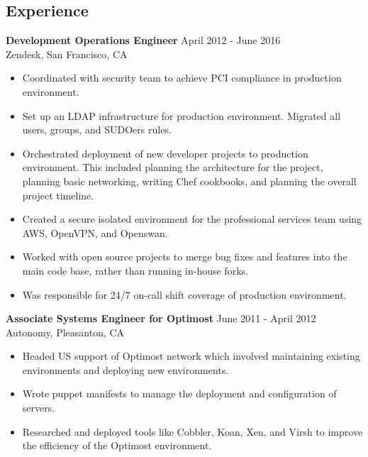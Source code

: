 \documentclass[10pt,line,letterpaper]{res}
\begin{document}
\address{968 Washington St Apt 4, San Francisco, CA}
\address{aaron.peschel@gmail.com or (760)-791-7301}

\begin{resume}
\pagestyle{empty}
\section{Experience}
    {\bf Development Operations Engineer} \hfill April 2012 - June 2016 \\
    Zendesk, San Francisco, CA
    \begin{itemize} \itemsep -2pt
    \item Coordinated with security team to achieve PCI compliance in production environment.
    \item Set up an LDAP infrastructure for production environment. Migrated all users, groups, and SUDOers rules.
    \item Orchestrated deployment of new developer projects to production environment. This included planning the architecture for the project, planning basic networking, writing Chef cookbooks, and planning the overall project timeline.
    \item Created a secure isolated environment for the professional services team using AWS, OpenVPN, and Openswan.
    \item Worked with open source projects to merge bug fixes and features into the main code base, rather than running in-house forks.
    \item Was responsible for 24/7 on-call shift coverage of production environment.
    \end{itemize}
    
    {\bf Associate Systems Engineer for Optimost} \hfill June 2011 - April 2012 \\
    Autonomy, Pleasanton, CA
    \begin{itemize} \itemsep -2pt
    \item Headed US support of Optimost network which involved maintaining existing environments and deploying new environments.
    \item Wrote puppet manifests to manage the deployment and configuration of servers.
    \item Researched and deployed tools like Cobbler, Koan, Xen, and Virsh to improve the efficiency of the Optimost environment.
    \end{itemize}


\end{resume}
\end{document}
